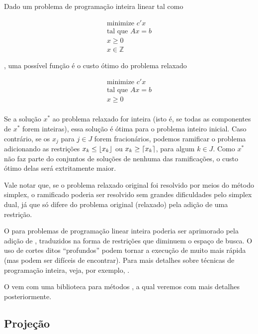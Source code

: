 \documentclass{article}
\begin{document}
Dado um problema de programação inteira linear tal como

\begin{align}
  \text{minimize } c'x \\
  \text{tal que }  Ax = b\\
           x \geq 0\\
           x \in \mathbb{Z}
\end{align}\label{eq:inteiro}

\noindent, uma possível função  é o custo ótimo do problema relaxado

\begin{align}
  \text{minimize } c'x \\
  \text{tal que }  Ax = b\\
           x \geq 0\\
\end{align}\label{eq:inteiro}

Se a solução $x^*$ ao problema relaxado for inteira (isto é, se todas as componentes de $x^*$ forem
inteiras), essa solução é ótima para o problema inteiro inicial. Caso contrário, se os $x_j$ para $j
\in J$ forem fracionários, podemos ramificar o problema adicionando as restrições $x_k \leq
\floor*{x_k}$ ou $x_k \geq \ceil*{x_k}$, para algum $k \in J$. Como $x^*$ não faz parte do
conjuntos de soluções de nenhuma das ramificações, o custo ótimo delas será extritamente maior.

Vale notar que, se o problema relaxado original foi resolvido por meios do método simplex, o
ramificado poderia ser resolvido sem grandes dificuldades pelo simplex dual, já que só difere do
problema original (relaxado) pela adição de uma restrição.

O  para problemas de programação linear inteira poderia ser aprimorado
pela adição de , traduzidos na forma de restrições que diminuem o espaço
de busca. O uso de cortes ditos ``profundos'' podem tornar a execução de  muito mais rápida (mas podem ser difíceis de encontrar). Para mais detalhes sobre técnicas
de programação inteira, veja, por exemplo, \cite{tsitsiklis}.

O \eclipse vem com uma biblioteca para métodos , a qual veremos com mais
detalhes posteriormente.

\subsection{Projeção}
\end{document}
